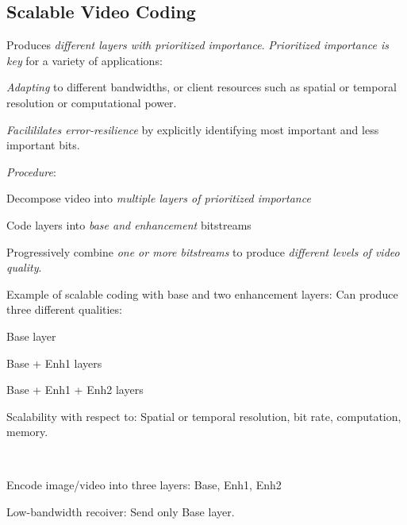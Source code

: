 \begin{compactdesc}
\section{Scalable Video Coding}
Produces \emph{different layers with prioritized importance}. \emph{Prioritized importance is key} for a variety of applications:\\
\begin{enumerate*}[label=\protect\circled{\arabic*},itemjoin=]
	\item \emph{Adapting} to different bandwidths, or client resources such as spatial or temporal resolution or computational power.\\
	\item \emph{Facilililates error-resilience} by explicitly identifying most important and less important bits.\\
\end{enumerate*}
\emph{Procedure}:\\
\begin{enumerate*}[label=\protect\circled{\arabic*},itemjoin=]
	\item Decompose video into \emph{multiple layers of prioritized importance}\\
	\item Code layers into \emph{base and enhancement} bitstreams\\
	\item Progressively combine \emph{one or more bitstreams} to produce \emph{different levels of video quality}.\\
\end{enumerate*}
Example of scalable coding with base and two enhancement layers: Can produce three different qualities:
\begin{enumerate*}[label=\protect\circled{\arabic*}]
	\item Base layer
	\item Base + Enh1 layers
	\item Base + Enh1 + Enh2 layers
\end{enumerate*}
Scalability with respect to: Spatial or temporal resolution, bit rate, computation, memory.
\item[\lp{Example}]\hfill\\
	\begin{itemize*}[label=\colorbullet]
		\item Encode image/video into three layers: Base, Enh1, Enh2\\
		\item Low-bandwidth recoiver: Send only Base layer.\\

\end{itemize*}
\end{compactdesc}
